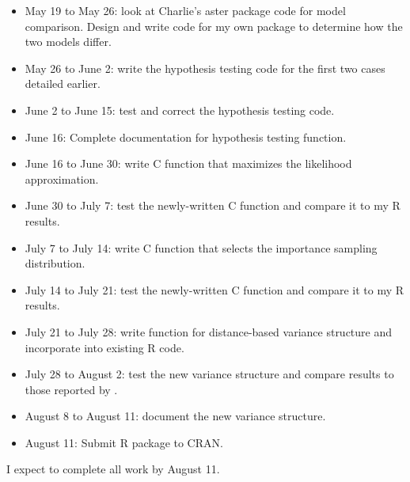 \documentclass[12pt]{article}
\begin{document}
\begin{itemize}
\item[] May 19 to May 26: look at Charlie's aster package code for model comparison. Design and write code for my own package to determine how the two models differ.
\item[] May 26 to June 2: write the hypothesis testing code for the first two cases detailed earlier.
\item[] June 2 to June 15: test and correct the hypothesis testing code.
\item[] June 16: Complete documentation for hypothesis testing function.
\item[] June 16 to June 30: write C function that maximizes the likelihood approximation.
\item[] June 30 to July 7: test the newly-written C function and compare it to my R results. 
\item[] July 7 to July 14: write C function that selects the importance sampling distribution.
\item[]July 14 to July 21: test the newly-written C function and compare it to my R results.
\item[] July 21 to July 28: write function for distance-based variance structure and incorporate into existing R code.
\item[] July 28 to August 2: test the new variance structure and compare results to those reported by \citet{caffojj:2005}.
\item[] August 8 to August 11: document the new variance structure.
\item[] August 11: Submit R package to CRAN.
\end{itemize}
I expect to complete all work by August 11.



\vspace{-2.3cm}
\renewcommand{\refname}{}


\end{document}
